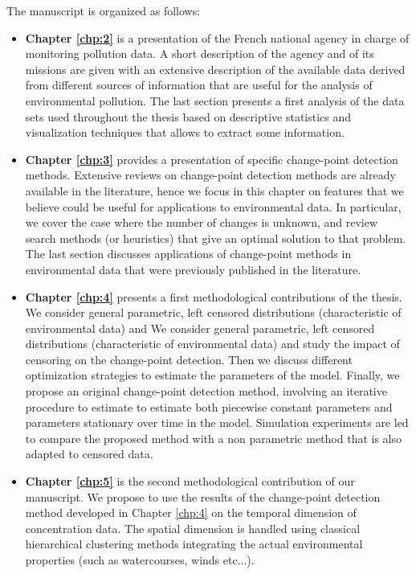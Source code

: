 The manuscript is organized as follows:
\begin{itemize}
\item{\textbf{Chapter \ref{chp:2}}} is a presentation of the French national agency in charge of monitoring pollution data. A short description of the agency and of its missions are given with an extensive description of the available data derived from different sources of information that are useful for the analysis of environmental pollution. The last section presents a first analysis of the data sets used throughout the thesis based on descriptive statistics and visualization techniques that allows to extract some information.
\item{\textbf{Chapter \ref{chp:3}}} provides a presentation of specific change-point detection methods. Extensive reviews on change-point detection  methods  are already  available in the literature,  hence we  focus  in this chapter on  features  that  we believe could  be  useful  for applications  to  environmental  data. In particular, we cover the case where the number of changes is unknown, and review search methods (or heuristics) that give an optimal solution to that problem. The last section discusses applications of change-point methods in environmental data that were previously published in the literature.
\item{\textbf{Chapter \ref{chp:4}}} presents a first methodological contributions of the thesis. 
We consider general parametric, left censored distributions (characteristic of environmental data) and We consider general parametric, left censored distributions (characteristic of environmental data) and study the impact of censoring on the change-point detection.  Then we discuss different optimization strategies to estimate the parameters of the model. Finally, we propose an original change-point detection method, involving an iterative procedure to estimate to estimate both piecewise constant parameters and parameters stationary over time in the model.  Simulation experiments are led to compare the proposed method with a non parametric method that is also adapted to censored data. 
\item{\textbf{Chapter \ref{chp:5}}} is the second methodological contribution of our manuscript. We propose to use the results of the change-point detection method developed in Chapter \ref{chp:4} on the temporal dimension of concentration data. The spatial dimension is handled using classical hierarchical clustering methods integrating the actual environmental properties (such as watercourses, winds etc...).

\end{itemize}
